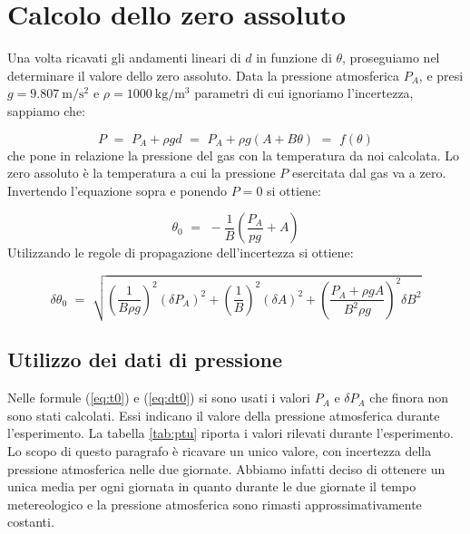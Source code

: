 \section{Calcolo dello zero assoluto}

Una volta ricavati gli andamenti lineari di $d$ in funzione di $\theta$, proseguiamo nel determinare il valore dello zero assoluto.
Data la pressione atmosferica $P_A$, e presi $g = \SI{9.807}{\meter\per\square\second}$ e
$\rho = \SI{1000}{\kilo\gram\per\cubic\metre}$ parametri di cui ignoriamo l'incertezza, sappiamo che:

\begin{equation}
	P \,\, = \,\, P_A + \rho g d \,\, = \,\, P_A + \rho g (A + B \theta) \,\, = \,\, f(\theta)
\end{equation}
%
che pone in relazione la pressione del gas con la temperatura da noi calcolata. Lo zero assoluto è la temperatura a cui la
pressione $P$ esercitata dal gas va a zero. Invertendo l'equazione sopra e ponendo $P = 0$ si ottiene:

\begin{equation}
	\theta_0 \,\, = \,\, - \frac{1}{B} \left( \frac{P_A}{pg} + A \right)
    \label{eq:t0}
\end{equation}
%
Utilizzando le regole di propagazione dell'incertezza si ottiene:

\begin{equation}
    \delta \theta_0 \,\, = \,\, \sqrt{\left(\frac{1}{B \rho g}\right)^2 (\delta P_A)^2 +
    \left(\frac{1}{B}\right)^2 (\delta A)^2 + \left(\frac{P_A + \rho g A}{B^2 \rho g} \right)^2 \delta B^2}
    \label{eq:dt0}
\end{equation}


\subsection{Utilizzo dei dati di pressione}
\label{press}

Nelle formule (\ref{eq:t0}) e (\ref{eq:dt0}) si sono usati i valori $P_A$ e $\delta P_A$ che finora non sono stati calcolati.
Essi indicano il valore della pressione atmosferica durante l'esperimento. La tabella \ref{tab:ptu} riporta i valori rilevati
durante l'esperimento. Lo scopo di questo paragrafo è ricavare un unico valore, con incertezza della pressione atmosferica nelle
due giornate. Abbiamo infatti deciso di ottenere un unica media per ogni giornata in quanto durante le due giornate il tempo metereologico e la
pressione atmosferica sono rimasti approssimativamente costanti.

